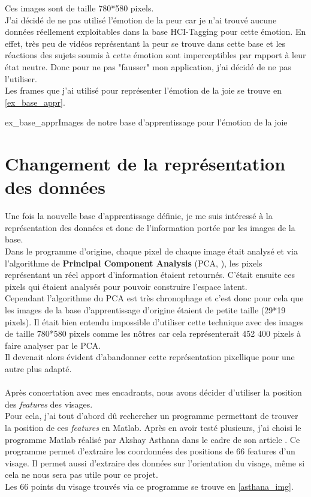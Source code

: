 \documentclass[poster]{polytech/polytech}
\begin{document}
Ces images sont de taille 780*580 pixels.\\
J'ai décidé de ne pas utilisé l'émotion de la peur car je n'ai trouvé aucune données réellement exploitables dans la base HCI-Tagging pour cette émotion. En effet, très peu de vidéos représentant la peur se trouve dans cette base et les réactions des sujets soumis à cette émotion sont imperceptibles par rapport à leur état neutre. Donc pour ne pas "fausser" mon application, j'ai décidé de ne pas l'utiliser.\\
Les frames que j'ai utilisé pour représenter l'émotion de la joie se trouve en \autoref{ex_base_appr}.

\begin{Figure}{ex_base_appr}{Images de notre base d'apprentissage pour l'émotion de la joie}
\end{Figure}

\section{Changement de la représentation des données}
Une fois la nouvelle base d'apprentissage définie, je me suis intéressé à la représentation des données et donc de l'information portée par les images de la base.\\
Dans le programme d'origine, chaque pixel de chaque image était analysé et via l'algorithme de \textbf{Principal Component Analysis} (PCA, \cite{book_pca}), les pixels représentant un réel apport d'information étaient retournés. C'était ensuite ces pixels qui étaient analysés pour pouvoir construire l'espace latent.\\
Cependant l'algorithme du PCA est très chronophage et c'est donc pour cela que les images de la base d'apprentissage d'origine étaient de petite taille (29*19 pixels). Il était bien entendu impossible d'utiliser cette technique avec des images de taille 780*580 pixels comme les nôtres car cela représenterait 452 400 pixels à faire analyser par le PCA.\\
Il devenait alors évident d'abandonner cette représentation pixellique pour une autre plus adapté.\\
\\
Après concertation avec mes encadrants, nous avons décider d'utiliser la position des \textit{features} des visages.\\
Pour cela, j'ai tout d'abord dû rechercher un programme permettant de trouver la position de ces \textit{features} en Matlab. Après en avoir testé plusieurs, j'ai choisi le programme Matlab réalisé par Akshay Asthana dans le cadre de son article \cite{asthana}. Ce programme permet d'extraire les coordonnées des positions de 66 features d'un visage. Il permet aussi d'extraire des données sur l'orientation du visage, même si cela ne nous sera pas utile pour ce projet.\\
Les 66 points du visage trouvés via ce programme se trouve en \autoref{asthana_img}.
\end{document}
